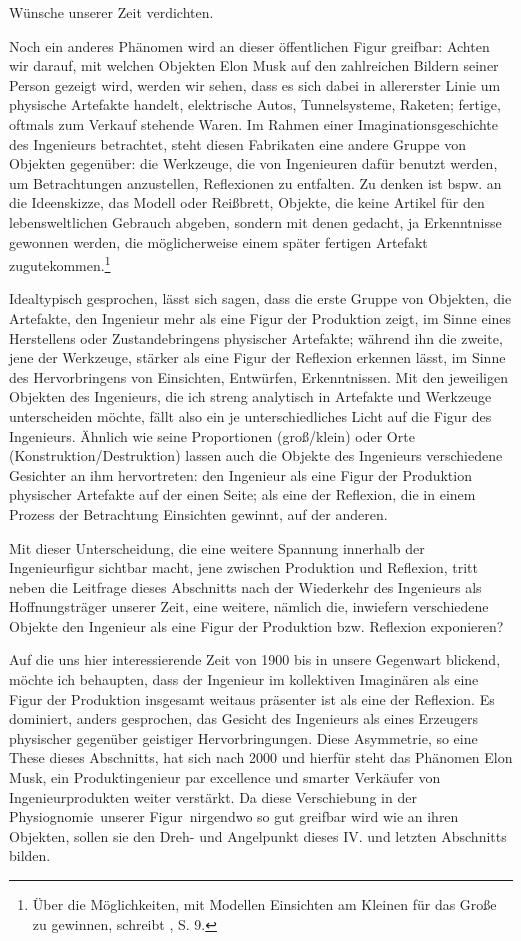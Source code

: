 \documentclass[%
	fontsize=10pt,%
	twoside,%
	headings=optiontoheadandtoc,%
	showtrims]{scrbook}
\renewcommand{\texttt}{\nohyphens} %
\begin{document}
Wünsche unserer Zeit verdichten.\par Noch ein anderes Phänomen wird an dieser öffentlichen Figur greifbar: Achten wir darauf, mit welchen Objekten Elon Musk auf den zahlreichen Bildern seiner Person gezeigt wird, werden wir sehen, dass es sich dabei in allererster Linie um physische Artefakte handelt, elektrische Autos, Tunnelsysteme, Raketen; fertige, oftmals zum Verkauf stehende Waren. Im Rahmen einer Imaginationsgeschichte des Ingenieurs betrachtet, steht diesen Fabrikaten eine andere Gruppe von Objekten gegenüber: die Werkzeuge, die von Ingenieuren dafür benutzt werden, um Betrachtungen anzustellen, Reflexionen zu entfalten. Zu denken ist bspw. an die Ideenskizze, das Modell oder Reißbrett, Objekte, die keine Artikel für den lebensweltlichen Gebrauch abgeben, sondern mit denen \texttt{gedacht}, ja Erkenntnisse gewonnen werden, die möglicherweise einem später fertigen Artefakt zugutekommen.\footnote{Über die Möglichkeiten, mit Modellen Einsichten am Kleinen für das Große zu gewinnen, schreibt \cite[][]{sattelmacher2021a}, S. 9.} \par Idealtypisch gesprochen, lässt sich sagen, dass die erste Gruppe von Objekten, die Artefakte, den Ingenieur mehr als eine Figur der Produktion zeigt, im Sinne eines Herstellens oder Zustandebringens physischer Artefakte; während ihn die zweite, jene der Werkzeuge, stärker als eine Figur der Reflexion erkennen lässt, im Sinne des Hervorbringens von Einsichten, Entwürfen, Erkenntnissen. Mit den jeweiligen Objekten des Ingenieurs, die ich streng analytisch in Artefakte und Werkzeuge unterscheiden möchte, fällt also ein je unterschiedliches Licht auf die Figur des Ingenieurs. Ähnlich wie seine Proportionen (groß/klein) oder Orte (Konstruktion/Destruktion) lassen auch die Objekte des Ingenieurs verschiedene Gesichter an ihm hervortreten: den Ingenieur als eine Figur der Produktion physischer Artefakte auf der einen Seite; als eine der Reflexion, die in einem Prozess der Betrachtung Einsichten gewinnt, auf der anderen.\par Mit dieser Unterscheidung, die eine weitere Spannung innerhalb der Ingenieurfigur sichtbar macht, jene zwischen Produktion und Reflexion, tritt neben die Leitfrage dieses Abschnitts nach der Wiederkehr des Ingenieurs als Hoffnungsträger unserer Zeit, eine weitere, nämlich die, inwiefern verschiedene Objekte den Ingenieur als eine Figur der Produktion bzw. Reflexion exponieren?\par Auf die uns hier interessierende Zeit von 1900 bis in unsere Gegenwart blickend, möchte ich behaupten, dass der Ingenieur im kollektiven Imaginären als eine Figur der Produktion insgesamt weitaus präsenter ist als eine der Reflexion. Es dominiert, anders gesprochen, das Gesicht des Ingenieurs als eines Erzeugers physischer gegenüber geistiger Hervorbringungen. Diese Asymmetrie, so eine These dieses Abschnitts, hat sich nach 2000 \textendash{} und hierfür steht das Phänomen Elon Musk, ein Produktingenieur par excellence und smarter Verkäufer von Ingenieurprodukten \textendash{} weiter verstärkt. Da diese Verschiebung in der \texttt{Physiognomie~unserer} \texttt{Figur~nirgendwo} so gut greifbar wird wie an ihren Objekten, sol\-len sie den Dreh- und Angelpunkt dieses IV. und letzten Abschnitts \texttt{bilden}.
\end{document}
